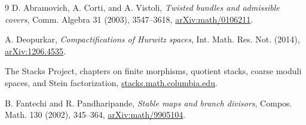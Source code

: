 \documentclass[11pt]{article}
\begin{document}
\begin{thebibliography}{9}
D. Abramovich, A. Corti, and A. Vistoli,
\emph{Twisted bundles and admissible covers}, Comm. Algebra 31 (2003),
3547--3618, \href{https://arxiv.org/abs/math/0106211}{arXiv:math/0106211}.

A. Deopurkar, \emph{Compactifications of Hurwitz spaces}, Int. Math. Res.
Not. (2014), \href{https://arxiv.org/abs/1206.4535}{arXiv:1206.4535}.

The Stacks Project, chapters on finite morphisms, quotient stacks, coarse
moduli spaces, and Stein factorization,
\href{https://stacks.math.columbia.edu}{stacks.math.columbia.edu}.

B. Fantechi and R. Pandharipande, \emph{Stable maps and branch divisors},
Compos. Math. 130 (2002), 345--364,
\href{https://arxiv.org/abs/math/9905104}{arXiv:math/9905104}.
\end{thebibliography}
\end{document}
